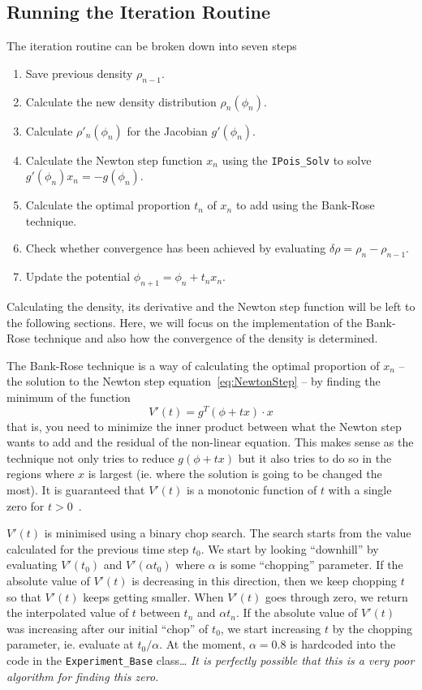 \documentclass[12pt]{article}
\newcommand{\red}[1]{{\color{red} \it #1}}
\begin{document}
\subsection{Running the Iteration Routine}
\label{subsec:IterationRoutine}

The iteration routine can be broken down into seven steps

\begin{enumerate}
    \item Save previous density $\rho_{n-1}$.
    \item Calculate the new density distribution $\rho_n (\phi_n)$.
    \item Calculate $\rho'_n (\phi_n)$ for the Jacobian $g'(\phi_n)$.
    \item Calculate the Newton step function $x_n$ using the \texttt{IPois\_Solv} to solve
    $g'(\phi_n) x_n = - g(\phi_n)$.
    \item Calculate the optimal proportion $t_n$ of $x_n$ to add using the Bank-Rose technique.
    \item Check whether convergence has been achieved by evaluating $\delta\rho = \rho_n - \rho_{n-1}$.
    \item Update the potential $\phi_{n+1} = \phi_n + t_n x_n$.
\end{enumerate}

Calculating the density, its derivative and the Newton step function will be left to the following
sections.  Here, we will focus on the implementation of the Bank-Rose technique and also how the
convergence of the density is determined.

The Bank-Rose technique is a way of calculating the optimal proportion of $x_n$ -- the solution
to the Newton step equation~\ref{eq:NewtonStep} -- by finding the minimum of the function
%
\begin{equation}
    V'(t) = g^T (\phi + t x) \cdot x
\end{equation}
%
that is, you need to minimize the inner product between what the Newton step wants to add and the
residual of the non-linear equation.  This makes sense as the technique not only tries to reduce
$g(\phi + tx)$ but it also tries to do so in the regions where $x$ is largest (ie. where the
solution is going to be changed the most).  It is guaranteed that $V'(t)$ is a monotonic function
of $t$ with a single zero for $t > 0$~\cite{Bank:????}.

$V'(t)$ is minimised using a binary chop search.  The search starts from the value calculated for
the previous time step $t_0$.  We start by looking ``downhill'' by evaluating $V'(t_0)$ and
$V'(\alpha t_0)$ where $\alpha$ is some ``chopping'' parameter.  If the absolute value of $V'(t)$
is decreasing in this direction, then we keep chopping $t$ so that $V'(t)$ keeps getting smaller.
When $V'(t)$ goes through zero, we return the interpolated value of $t$ between $t_n$ and
$\alpha t_n$.  If the absolute value of $V'(t)$ was increasing after our
initial ``chop'' of $t_0$, we start increasing $t$ by the chopping parameter, ie. evaluate at
$t_0 / \alpha$.  At the moment, $\alpha = 0.8$ is hardcoded into the code in the
\texttt{Experiment\_Base} class\ldots \red{It is perfectly possible that this is a very poor
algorithm for finding this zero.}
\end{document}
